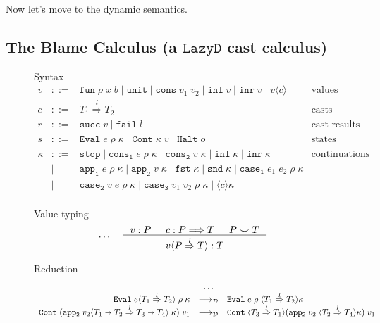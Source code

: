 \documentclass[acmsmall,review,anonymous]{acmart}\settopmatter{printfolios=true,printccs=false,printacmref=false}
\newcommand{\stxrule}[3]{#1 & ::= & #3 & \text{#2}\\}
\newcommand{\stxrulecont}[1]{& | & #1 & \\}
\newcommand{\lazyD}{$\mathtt{Lazy D}$}
\newcommand{\sOOinspect}[3]{\mathtt{Eval} \; #1 \; #2 \; #3}
\newcommand{\sOOreturn}[2]{\mathtt{Cont} \; #2 \; #1}
\newcommand{\sOOhalt}[1]{\mathtt{Halt} \; #1}
\newcommand{\POOfun}[2]{#1 \shortrightarrow #2}
\newcommand{\eOOcast}[4]{#1 \langle \cOOcast{#2}{#3}{#4} \rangle}
\newcommand{\cOOcast}[3]{#1 \overset{#2}{\Rightarrow} #3}
\newcommand{\vOOcast}[2]{#1\langle#2\rangle}
\newcommand{\vOOfun}[3]{\mathtt{fun} \; #1 \; #2 \; #3}
\newcommand{\vOOtt}[0]{\mathtt{unit}}
\newcommand{\vOOcons}[2]{\mathtt{cons}\;#1\;#2}
\newcommand{\vOOinl}[1]{\mathtt{inl}\;#1}
\newcommand{\vOOinr}[1]{\mathtt{inr}\;#1}
\newcommand{\rOOsucc}[1]{\mathtt{succ}\;#1}
\newcommand{\rOOfail}[1]{\mathtt{fail}\;#1}
\newcommand{\judgeDBreduce}[2]{#1 \longrightarrow_{\mathcal{D}} #2}
\newcommand{\redrule}[3]{#1 & \longrightarrow_\mathcal{D} & #2 & #3\\}
\begin{document}
Now let's move to the dynamic semantics. 

\subsection{The Blame Calculus (a \lazyD{} cast calculus)}

\begin{figure}
	Syntax
	\[
	\begin{array}{rclr}
	
	\stxrule{v}{values}{
		\vOOfun{\rho}{x}{b} \mid
		\vOOtt{} \mid
		\vOOcons{v_1}{v_2} \mid
		\vOOinl{v} \mid
		\vOOinr{v} \mid		
		\vOOcast{v}{c}
	}
	\stxrule{c}{casts}{
		\cOOcast{T_1}{l}{T_2}
	}
	\stxrule{r}{cast results}{
		\rOOsucc{v} \mid
		\rOOfail{l}
	}
	\stxrule{s}{states}{
		\sOOinspect{e}{\rho}{\kappa} \mid{}
		\sOOreturn{v}{\kappa} \mid{}
		\sOOhalt{o}
	}
		
	\stxrule{\kappa}{continuations}{
		\mathtt{stop} \mid{}
		\mathtt{cons_1} \; e \; \rho \; \kappa \mid{}
		\mathtt{cons_2} \; v \; \kappa \mid{}
		\mathtt{inl} \; \kappa \mid{}
		\mathtt{inr} \; \kappa
	}
	\stxrulecont{
		\mathtt{app_1} \; e \; \rho \; \kappa \mid{}
		\mathtt{app_2} \; v \; \kappa \mid{}
		\mathtt{fst} \; \kappa \mid{}
		\mathtt{snd} \; \kappa \mid
		\mathtt{case_1} \; e_1 \; e_2 \; \rho \; \kappa
	}
	\stxrulecont{	
		\mathtt{case_2} \; v   \; e   \; \rho \; \kappa \mid{}
		\mathtt{case_3} \; v_1 \; v_2 \; \rho \; \kappa \mid
		\langle c \rangle \kappa
	}
	\end{array}
	\]
	
	Value typing 
	\begin{gather*}
	\dots \quad
	\inference{
		v : P &
		c : P \Longrightarrow T &
		P \smile T
	}{
		\vOOcast{v}{\cOOcast{P}{l}{T}} : T
	}
	\end{gather*}
	
	
	Reduction \fbox{$ \judgeDBreduce{s}{s} $}
	\[
	\begin{array}{rclr}
	
	& \dots  \\
	\redrule{
		\sOOinspect{\eOOcast{e}{T_1}{l}{T_2}}{\rho}{\kappa}
	}{
		\sOOinspect{e}{\rho}{\langle\cOOcast{T_1}{l}{T_2}\rangle\kappa}
	}{}
	\redrule{
		\sOOreturn{v_1}{(\mathtt{app_2} \; \vOOcast{v_2}{
				\cOOcast{\POOfun{T_1}{T_2}}{l}{\POOfun{T_3}{T_4}}
			} \; \kappa)}
	}{
		\sOOreturn{v_1}{
		\langle\cOOcast{T_3}{l}{T_1}\rangle
		(\mathtt{app_2} \; v_2 \; 
		\langle\cOOcast{T_2}{l}{T_4}\rangle \kappa)}
	}{}
	

\end{array}\]
\end{figure}
\end{document}
